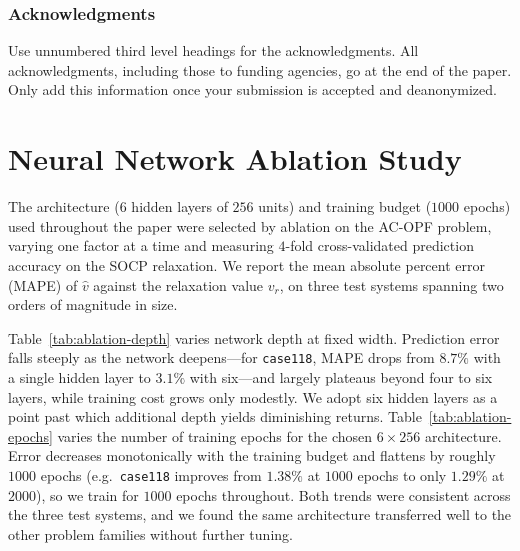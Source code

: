 \documentclass[10pt]{article} %
\theoremstyle{plain}
\theoremstyle{definition}
\theoremstyle{remark}
\begin{document}
\subsubsection*{Acknowledgments}
Use unnumbered third level headings for the acknowledgments. All
acknowledgments, including those to funding agencies, go at the end of the paper.
Only add this information once your submission is accepted and deanonymized. 




\appendix

\section{Neural Network Ablation Study} \label{app:ablation}

The architecture ($6$ hidden layers of $256$ units) and training budget ($1000$ epochs) used throughout the paper were selected by ablation on the AC-OPF problem, varying one factor at a time and measuring $4$-fold cross-validated prediction accuracy on the SOCP relaxation. We report the mean absolute percent error (MAPE) of $\hat{v}$ against the relaxation value $v_r$, on three test systems spanning two orders of magnitude in size.

Table~\ref{tab:ablation-depth} varies network depth at fixed width. Prediction error falls steeply as the network deepens---for \texttt{case118}, MAPE drops from $8.7\%$ with a single hidden layer to $3.1\%$ with six---and largely plateaus beyond four to six layers, while training cost grows only modestly. We adopt six hidden layers as a point past which additional depth yields diminishing returns. Table~\ref{tab:ablation-epochs} varies the number of training epochs for the chosen $6\times256$ architecture. Error decreases monotonically with the training budget and flattens by roughly $1000$ epochs (e.g.\ \texttt{case118} improves from $1.38\%$ at $1000$ epochs to only $1.29\%$ at $2000$), so we train for $1000$ epochs throughout. Both trends were consistent across the three test systems, and we found the same architecture transferred well to the other problem families without further tuning.
\end{document}

